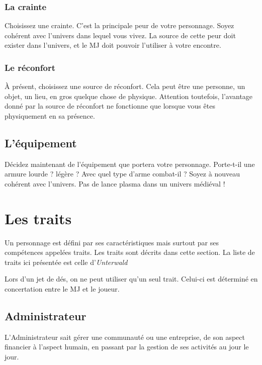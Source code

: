 \documentclass[a4paper,10pt,twoside,twocolumn,openany,bg=print]{dndbook}
\begin{document}
\subsection*{La crainte}

Choisissez une crainte. C'est la principale peur de votre personnage. Soyez cohérent avec l'univers dans lequel vous vivez. La source de cette peur doit exister dans l'univers, et le MJ doit pouvoir l'utiliser à votre encontre.

\subsection*{Le réconfort}

À présent, choisissez une source de réconfort. Cela peut être une personne, un objet, un lieu, en gros quelque chose de physique. Attention toutefois, l'avantage donné par la source de réconfort ne fonctionne que lorsque vous êtes physiquement en sa présence.

\section{L'équipement}

Décidez maintenant de l'équipement que portera votre personnage. Porte-t-il une armure lourde ? légère ? Avec quel type d'arme combat-il ? Soyez à nouveau cohérent avec l'univers. Pas de lance plasma dans un univers médiéval !

\newpage

\chapter{Les traits}

Un personnage est défini par ses caractéristiques mais surtout par ses compétences appelées traits. Les traits sont décrits dans cette section. La liste de traits ici présentée est celle d'\emph{Unterwald}

Lors d'un jet de dés, on ne peut utiliser qu'un seul trait. Celui-ci est déterminé en concertation entre le MJ et le joueur.

\section*{Administrateur}

L'Administrateur sait gérer une communauté ou une entreprise, de son aspect financier à l'aspect humain, en passant par la gestion de ses activités au jour le jour.
\end{document}

